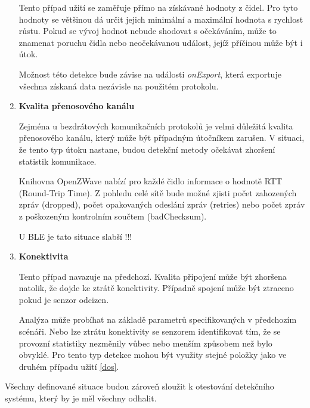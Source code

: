 \begin{enumerate}
    Tento případ užití se zaměřuje přímo na získávané hodnoty z čidel. Pro tyto hodnoty se většinou
    dá určit jejich minimální a maximální hodnota s rychlost růstu. Pokud se vývoj hodnot nebude 
    shodovat s očekáváním, může to znamenat poruchu čidla nebo neočekávanou událost, jejíž příčinou 
    může být i útok.
    
    Možnost této detekce bude závise na události \textit{onExport}, která exportuje všechna
    získaná data nezávisle na použitém protokolu.
    
    \item \textbf{Kvalita přenosového kanálu}
    
    Zejména u bezdrátových komunikačních protokolů je velmi důležitá kvalita přenosového kanálu,
    který může být případným útočníkem zarušen. V situaci, že tento typ útoku nastane, budou 
    detekční metody očekávat zhoršení statistik komunikace. 
    
    Knihovna OpenZWave nabízí pro každé čidlo informace o hodnotě RTT (Round-Trip Time). Z pohledu 
    celé sítě bude možné zjisti počet zahozených zpráv (dropped), počet opakovaných odeslání zpráv 
    (retries) nebo počet zpráv z poškozeným kontrolním součtem (badChecksum).
    
    U BLE je tato situace slabší !!!
    
    \item \textbf{Konektivita}
    
    Tento případ navazuje na předchozí. Kvalita připojení může být zhoršena natolik, že dojde 
    ke ztrátě konektivity. Případně spojení může být ztraceno pokud je senzor odcizen. 
    
    Analýza může probíhat na základě parametrů specifikovaných v předchozím scénáři. Nebo lze 
    ztrátu konektivity se senzorem identifikovat tím, že se provozní statistiky nezměnily vůbec nebo
    menším způsobem než bylo obvyklé. Pro tento typ detekce mohou být využity stejné položky
    jako ve druhém případu užití \ref{dos}.
    
   \end{enumerate}

  Všechny definované situace budou zároveň sloužit k otestování detekčního systému, který by je
  měl všechny odhalit.